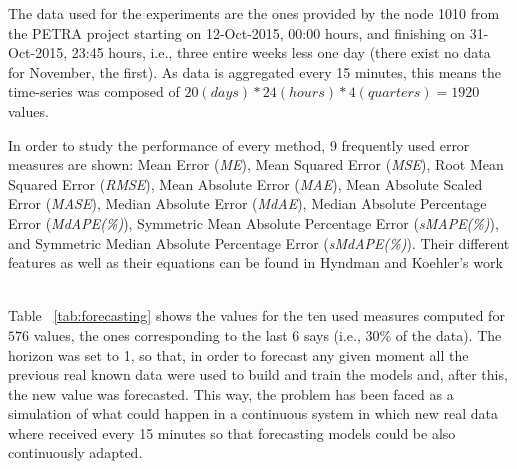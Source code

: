 The data used for the experiments are the ones provided by the node 1010 from the PETRA project starting on 12-Oct-2015, 00:00 hours, and finishing on 31-Oct-2015, 23:45 hours, i.e., three entire weeks less one day (there exist no data for November, the first). As data is aggregated every 15 minutes, this means the time-series was composed of $20(days)*24(hours)*4(quarters)=1920$ values.

In order to study the performance of every method, 9 frequently used error measures are shown:
Mean Error ({\em ME}),
 Mean Squared Error ({\em MSE}),
 Root Mean Squared Error ({\em RMSE}),
 Mean Absolute Error ({\em MAE}),
 Mean Absolute Scaled Error ({\em MASE}),
 Median Absolute Error ({\em MdAE}),
 Median Absolute Percentage Error ({\em MdAPE(\%)}),
 Symmetric Mean Absolute Percentage Error ({\em sMAPE(\%)}), and
 Symmetric Median Absolute Percentage Error ({\em sMdAPE(\%)}).
Their different features as well as their equations can be found in Hyndman and Koehler's work ~\cite{RePEc:eee:intfor:v:22:y:2006:i:4:p:679-688}

Table ~\ref{tab:forecasting} shows the values for the ten used measures computed for $576$ values, the ones corresponding to the last 6 says (i.e., $30\%$ of the data). The horizon was set to 1, so that, in order to forecast any given moment all the previous real known data were used to build and train the models and, after this, the new value was forecasted. This way, the problem has been faced as a simulation of what could happen in a continuous system in which new real data where received every 15 minutes so that forecasting models could be also continuously adapted.






